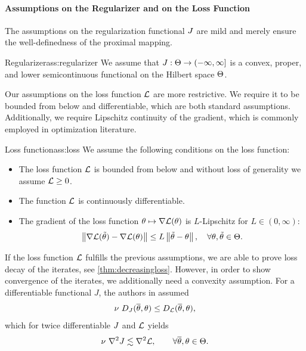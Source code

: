 \paragraph{Assumptions on the Regularizer and on the Loss Function}
%
The assumptions on the regularization functional $J$ are mild and merely ensure the well-definedness of the proximal mapping.
%
%
\begin{assumption}{Regularizer}{ass:regularizer}
We assume that $J:\Theta\to(-\infty,\infty]$ is a convex, proper, and lower semicontinuous functional on the Hilbert space $\Theta$.
\end{assumption}
%
%
\noindent%
Our assumptions on the loss function $\mathcal{L}$ are more restrictive. We require it to be bounded from below and differentiable, which are both standard assumptions. Additionally, we require Lipschitz continuity of the gradient, which is commonly employed in optimization literature.
%
\begin{assumption}{Loss function}{ass:loss}
We assume the following conditions on the loss function:
\begin{itemize}
    \item The loss function $\mathcal{L}$ is bounded from below and without loss of generality we assume $\mathcal{L}\geq 0$.
    \item The function $\mathcal{L}$ is continuously differentiable.
    \item The gradient of the loss function $\theta\mapsto\nabla\mathcal{L}(\theta)$ is $L$-Lipschitz for $L\in(0,\infty)$:
    \begin{align}\label{ineq:gradLip}
        \left\|\nabla\mathcal{L}(\tilde{\theta})-\nabla\mathcal{L}(\theta)\right\|\leq L \left\|\tilde{\theta}-\theta\right\|,\quad \forall \theta,\tilde{\theta}\in\Theta.
    \end{align}
\end{itemize}
\end{assumption}
%
%
\noindent%
If the loss function $\mathcal{L}$ fulfills the previous assumptions, we are able to prove loss decay of the iterates, see \cref{thm:decreasingloss}. However, in order to show convergence of the iterates, we additionally need a convexity assumption. For a differentiable functional $J$, the authors in \cite{dragomir2021fast} assumed
%
\begin{align*}
\nu\ D_J(\overline\theta,\theta) \leq D_{\mathcal{L}}(\overline\theta,\theta),
\end{align*}
%
which for twice differentiable $J$ and $\mathcal{L}$ yields
%
\begin{align*}
\nu\ \nabla^2 J \lesssim \nabla^2 \mathcal{L},\qquad\forall\overline\theta,\theta\in\Theta.
\end{align*}
